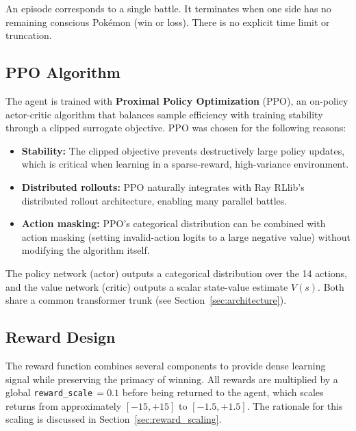 An episode corresponds to a single battle.  It terminates when one side has no
remaining conscious Pok\'{e}mon (win or loss).  There is no explicit time limit
or truncation.

\subsection{PPO Algorithm}

The agent is trained with \textbf{Proximal Policy Optimization} (PPO), an
on-policy actor-critic algorithm that balances sample efficiency with training
stability through a clipped surrogate objective.  PPO was chosen for the
following reasons:

\begin{itemize}
  \item \textbf{Stability:} The clipped objective prevents destructively large
        policy updates, which is critical when learning in a sparse-reward,
        high-variance environment.
  \item \textbf{Distributed rollouts:} PPO naturally integrates with Ray
        RLlib's distributed rollout architecture, enabling many parallel
        battles.
  \item \textbf{Action masking:} PPO's categorical distribution can be
        combined with action masking (setting invalid-action logits to a large
        negative value) without modifying the algorithm itself.
\end{itemize}

The policy network (actor) outputs a categorical distribution over the 14
actions, and the value network (critic) outputs a scalar state-value estimate
$V(s)$.  Both share a common transformer trunk (see
Section~\ref{sec:architecture}).

\subsection{Reward Design}
\label{sec:reward_design}

The reward function combines several components to provide dense learning signal
while preserving the primacy of winning.  All rewards are multiplied by a
global \texttt{reward\_scale}$\,=0.1$ before being returned to the agent, which
scales returns from approximately $[-15, +15]$ to $[-1.5, +1.5]$.  The
rationale for this scaling is discussed in
Section~\ref{sec:reward_scaling}.

